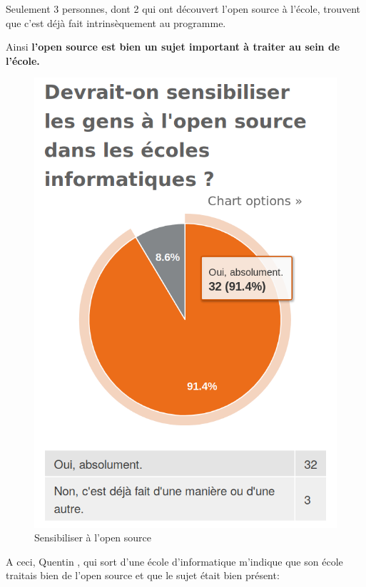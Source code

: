 			Seulement 3 personnes, dont 2 qui ont découvert l'open source à l'école, trouvent que c'est déjà fait intrinsèquement au programme.

			Ainsi \textbf{l'open source est bien un sujet important à traiter au sein de l'école.}

			\begin{figure}[!htb]
				\center
				\includegraphics[scale=0.28]{./img/a6}
				\caption{Sensibiliser à l'open source}
			\end{figure}

			A ceci, Quentin , qui sort d'une école d'informatique m'indique que son école traitais bien de l'open source et que le sujet était bien présent:

			\begin{center}
				\textit{
				}
			\end{center}

